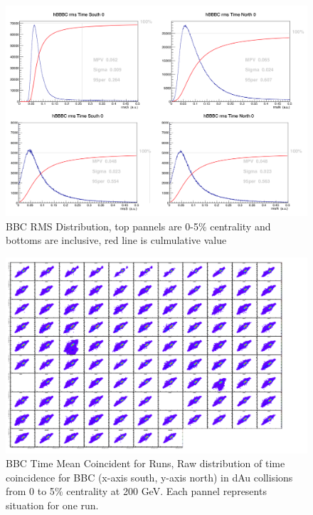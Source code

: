 \documentclass{article}
\begin{document}
\begin{figure}[!htb]
  \centering  
    \includegraphics[width=\textwidth]{fig_pi0vn/bbc_timing_rms.png}
  \caption[BBC RMS Distribution]{BBC RMS Distribution, top pannels are 0-5$\%$ centrality and bottoms are inclusive, 
  red line is culmulative value}
  \label{fig:BBC Time RMS}
\end{figure}

\begin{figure}[!htb]
  \centering  
    \includegraphics[width=\textwidth]{fig_pi0vn/bbc_timemean_corr.png}
  \caption[BBC Time Mean Coincident for Runs]{BBC Time Mean Coincident for Runs, Raw distribution of time coincidence for BBC (x-axis south, y-axis north) in dAu 
  collisions from 0 to 5$\%$ centrality at 200 GeV. Each pannel represents situation for one run.}
  \label{fig:BBC Time Mean Coincident for Runs}
\end{figure}
\end{document}
